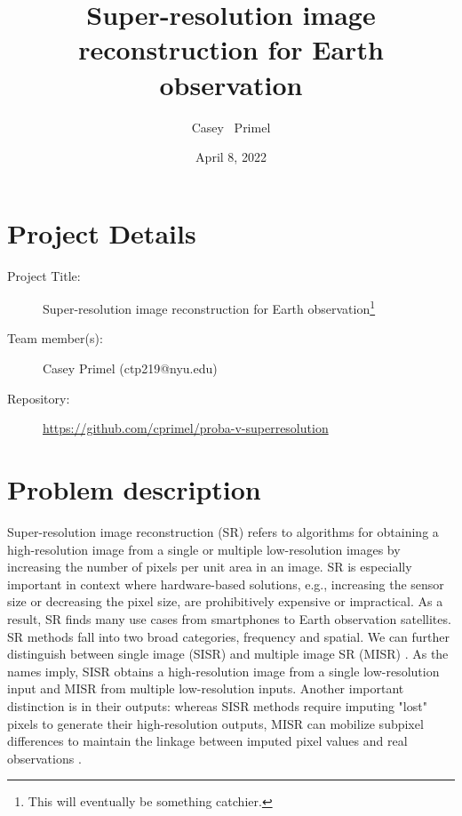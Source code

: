 \documentclass{article}
\title{Super-resolution image reconstruction for Earth observation}
\date{April 8, 2022}
\author{Casey ~Primel}
\begin{document}
\maketitle


\section{Project Details}
    \begin{description}
        \item[Project Title:] Super-resolution image reconstruction for Earth observation\footnote{This will eventually be something catchier.}
        \item[Team member(s):] Casey Primel (ctp219@nyu.edu)
        \item[Repository:] \url{https://github.com/cprimel/proba-v-superresolution}
    \end{description}

\section{Problem description}
\label{sec:headings}

Super-resolution image reconstruction (SR) refers to algorithms for obtaining a high-resolution image from a single or multiple low-resolution images by increasing the number of pixels per unit area in an image. SR is especially important in context where hardware-based solutions, e.g., increasing the sensor size or decreasing the pixel size, are prohibitively expensive or impractical. As a result, SR finds many use cases from smartphones to Earth observation satellites. SR methods fall into two broad categories, frequency and spatial. We can further distinguish between single image (SISR) and multiple image SR (MISR) \citep{Nasrollahi2014}. As the names imply, SISR obtains a high-resolution image from a single low-resolution input and MISR from multiple low-resolution inputs. Another important distinction is in their outputs: whereas SISR methods require imputing "lost" pixels to generate their high-resolution outputs, MISR can mobilize subpixel differences to maintain the linkage between imputed pixel values and real observations \citep{Martens2021}.
\end{document}
